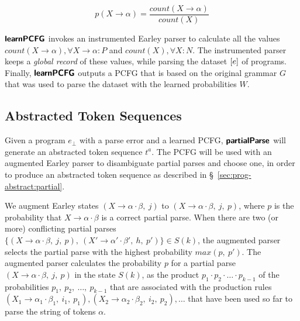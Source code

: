 \begin{equation*}
    p(X \rightarrow \alpha) = \frac{count(X \rightarrow \alpha)}{count(X)}
\end{equation*}



$\bm{\mathsf{learnPCFG}}$ invokes an instrumented Earley parser to calculate all the
values $count(X \rightarrow \alpha), \forall X \rightarrow \alpha: P$ and
$count(X), \forall X: N$. The instrumented parser keeps a \emph{global record}
of these values, while parsing the dataset $[e]$ of programs. Finally,
$\bm{\mathsf{learnPCFG}}$ outputs a PCFG that is based on the original grammar $G$ that
was used to parse the dataset with the learned probabilities $W$.

\subsection{Abstracted Token Sequences}

Given a program $e_{\bot}$ with a parse error and a learned PCFG, $\bm{\mathsf{partialParse}}$
will generate an abstracted token sequence $t^a$. The PCFG will be used with an
augmented Earley parser to disambiguate partial parses and choose one, in order
to produce an abstracted token sequence as described in
\S~\ref{sec:prog-abstract:partial}.

%
We augment Earley states $(X \rightarrow \alpha \cdot \beta,\ j)$ to $(X
\rightarrow \alpha \cdot \beta,\ j,\ p)$, where $p$ is the probability that $X
\rightarrow \alpha \cdot \beta$ is a correct partial parse. When there are two
(or more) conflicting partial parses $\{(X \rightarrow \alpha \cdot \beta,\ j,\
p),\ (X' \rightarrow \alpha' \cdot \beta',\ h,\ p')\} \in S(k)$, the augmented
parser selects the partial parse with the highest probability $max(p,\ p')$. The
augmented parser calculates the probability $p$ for a partial parse $(X
\rightarrow \alpha \cdot \beta,\ j,\ p)$ in the state $S(k)$, as the product
$p_1 \cdot p_2 \cdot \dots \cdot p_{k-1}$ of the probabilities $p_1,\ p_2,\
\dots,\ p_{k-1}$ that are associated with the production rules $(X_1 \rightarrow
\alpha_1 \cdot \beta_1,\ i_1,\ p_1), (X_2 \rightarrow \alpha_2 \cdot \beta_2,\
i_2,\ p_2), \dots$ that have been used so far to parse the string of tokens
$\alpha$.
